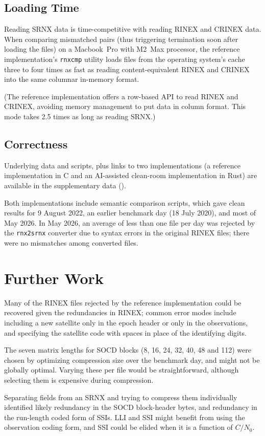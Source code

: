 \documentclass[letterpaper,times]{IONconf-v2}
\begin{document}
\subsection{Loading Time}

Reading SRNX data is time-competitive with reading RINEX and CRINEX data.
When comparing mismatched pairs (thus triggering termination soon after
loading the files) on a Macbook~Pro with M2~Max processor, the reference
implementation's \texttt{rnxcmp} utility loads files from the operating
system's cache three to four times as fast as reading content-equivalent
RINEX and CRINEX into the same columnar in-memory format.

(The reference implementation offers a row-based API to read RINEX and
CRINEX, avoiding memory management to put data in column format.
This mode takes 2.5 times as long as reading SRNX.)

\subsection{Correctness}

Underlying data and scripts, plus links to two implementations (a
reference implementation in C and an AI-assisted clean-room
implementation in Rust) are available in the supplementary data
(\cite{REPO}).

Both implementations include semantic comparison scripts, which gave
clean results for 9 August 2022, an earlier benchmark day (18 July 2020),
and most of May 2026.
In May 2026, an average of less than one file per day was rejected by
the \texttt{rnx2srnx} converter due to syntax errors in the original
RINEX files; there were no mismatches among converted files.

\section{Further Work}

Many of the RINEX files rejected by the reference implementation could
be recovered given the redundancies in RINEX; common error modes include
including a new satellite only in the epoch header or only in the
observations, and specifying the satellite code with spaces in place of
the identifying digits.

The seven matrix lengths for SOCD blocks (8, 16, 24, 32, 40, 48 and 112)
were chosen by optimizing compression size over the benchmark day, and
might not be globally optimal.
Varying these per file would be straightforward, although selecting them
is expensive during compression.

Separating fields from an SRNX and trying to compress them individually
identified likely redundancy in the SOCD block-header bytes, and
redundancy in the run-length coded form of SSIs.
LLI and SSI might benefit from using the observation coding form, and
SSI could be elided when it is a function of $C/N_0$.

\printbibliography[title=References]
\end{document}

